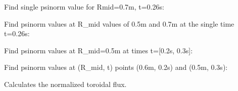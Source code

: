 \documentclass[letterpaper,10pt,english]{sphinxmanual}
\begin{document}
\begin{fulllineitems}
\begin{fulllineitems}
Find single psinorm value for Rmid=0.7m, t=0.26s:

\begin{sphinxVerbatim}[commandchars=\\\{\}]
   
\end{sphinxVerbatim}

Find psinorm values at R\_mid values of 0.5m and 0.7m at the single time
t=0.26s:

\begin{sphinxVerbatim}[commandchars=\\\{\}]
  \PYG{p}{[} \PYG{p}{]} 
\end{sphinxVerbatim}

Find psinorm values at R\_mid=0.5m at times t={[}0.2s, 0.3s{]}:

\begin{sphinxVerbatim}[commandchars=\\\{\}]
   \PYG{p}{[} \PYG{p}{]}
\end{sphinxVerbatim}

Find psinorm values at (R\_mid, t) points (0.6m, 0.2s) and (0.5m, 0.3s):

\begin{sphinxVerbatim}[commandchars=\\\{\}]
  \PYG{p}{[} \PYG{p}{]} \PYG{p}{[} \PYG{p}{]} 
\end{sphinxVerbatim}

\end{fulllineitems}


\begin{fulllineitems}
\label{\detokenize{eqtools:eqtools.core.Equilibrium.rmid2phinorm}}
Calculates the normalized toroidal flux.


\end{fulllineitems}
\end{fulllineitems}
\end{document}
